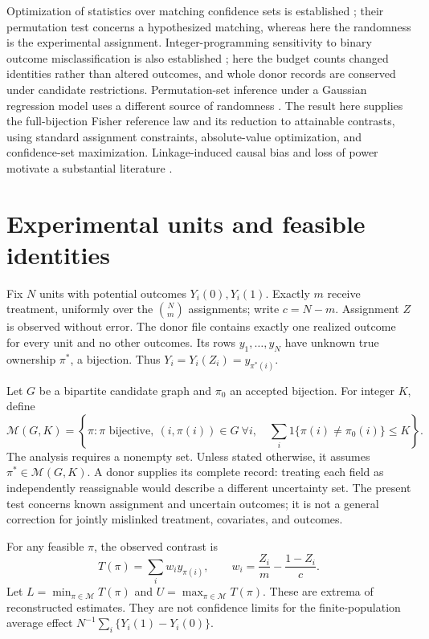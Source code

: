 \documentclass[11pt]{article}
\newcommand{\M}{\mathcal M}
\begin{document}
Optimization of statistics over matching confidence sets is established
\citep{hall}; their permutation test concerns a hypothesized matching, whereas here the
randomness is the experimental assignment. Integer-programming sensitivity to binary
outcome misclassification is also established \citep{heng}; here the budget counts changed
identities rather than altered outcomes, and whole donor records are conserved under
candidate restrictions. Permutation-set inference under a Gaussian regression model uses
a different source of randomness \citep{ota}. The result here supplies the full-bijection
Fisher reference law and its reduction to attainable contrasts, using standard assignment
constraints, absolute-value optimization, and confidence-set maximization. Linkage-induced
causal bias and loss of power motivate a substantial literature \citep{wortman,tahamont}.

\section{Experimental units and feasible identities}
Fix $N$ units with potential outcomes $Y_i(0),Y_i(1)$. Exactly $m$ receive treatment,
uniformly over the $\binom Nm$ assignments; write $c=N-m$. Assignment $Z$ is observed without
error. The donor file contains exactly one realized outcome for every unit and no other
outcomes. Its rows $y_1,\ldots,y_N$ have unknown true ownership $\pi^*$, a bijection.
Thus $Y_i=Y_i(Z_i)=y_{\pi^*(i)}$.

Let $G$ be a bipartite candidate graph and $\pi_0$ an accepted bijection. For integer $K$,
define
\[
 \M(G,K)=\left\{\pi:\pi\text{ bijective},\ (i,\pi(i))\in G\ \forall i,
 \quad \sum_i1\{\pi(i)\ne\pi_0(i)\}\le K\right\}.
\]
The analysis requires a nonempty set. Unless stated otherwise, it assumes $\pi^*\in\M(G,K)$.
A donor supplies its complete record: treating each field as independently reassignable
would describe a different uncertainty set. The present test concerns known assignment
and uncertain outcomes; it is not a general correction for jointly mislinked treatment,
covariates, and outcomes.

For any feasible $\pi$, the observed contrast is
\[
 T(\pi)=\sum_iw_i y_{\pi(i)},\qquad
 w_i=\frac{Z_i}{m}-\frac{1-Z_i}{c}.
\]
Let $L=\min_{\pi\in\M}T(\pi)$ and $U=\max_{\pi\in\M}T(\pi)$.
These are extrema of reconstructed estimates. They are not confidence limits for the
finite-population average effect $N^{-1}\sum_i\{Y_i(1)-Y_i(0)\}$.
\end{document}
